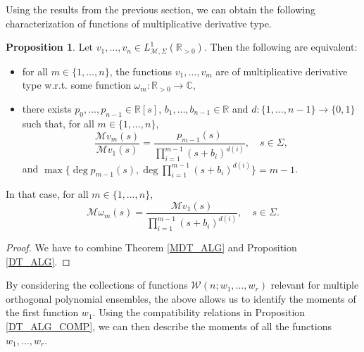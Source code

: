 \documentclass[a4paper,12pt,oneside]{article}
\theoremstyle{definition}
\newtheorem{prop}[defi]{Proposition}
\newcommand{\C}{\mathbb{C}}
\newcommand{\R}{\mathbb{R}}
\newcommand{\om}{\omega}
\newcommand{\MT}[1]{\mathcal{M}#1}
\begin{document}
Using the results from the previous section, we can obtain the following characterization of functions of multiplicative derivative type.

\begin{prop} \label{MDT_SR}
    Let $v_1,\dots,v_n\in L^1_{\MT{},\Sigma}(\R_{>0})$.
    Then the following are equivalent:
    \begin{itemize}
        \item[$i)$] for all $m\in\{1,\dots,n\}$, the functions $v_1,\dots,v_m$ are of multiplicative derivative type w.r.t. some function $\om_m:\R_{>0}\to\C$,
        \item[$ii)$] there exists $p_0,\dots,p_{n-1}\in\R[s]$, $b_1,\dots,b_{n-1}\in\R$ and $d:\{1,\dots,n-1\}\to\{0,1\}$ such that, for all $m\in\{1,\dots,n\}$,
        $$ \frac{\MT{v_m}(s)}{\MT{v_1}(s)} = \frac{p_{m-1}(s)}{\prod_{i=1}^{m-1}(s+b_i)^{d(i)}},\quad s\in\Sigma, $$
    and $\max\{\deg p_{m-1}(s),\deg \prod_{i=1}^{m-1}(s+b_i)^{d(i)}\}=m-1$.
    \end{itemize}
    In that case, for all $m\in\{1,\dots,n\}$,
    $$ \MT{\om_m}(s) = \frac{\MT{v_1}(s)}{\prod_{i=1}^{m-1} (s+b_i)^{d(i)}},\quad s\in\Sigma.$$
\end{prop}
\begin{proof}
    We have to combine Theorem \ref{MDT_ALG} and Proposition \ref{DT_ALG}.
\end{proof}    

By considering the collections of functions $\mathcal{W}(n;w_1,\dots,w_r)$ relevant for multiple orthogonal polynomial ensembles, the above allows us to identify the moments of the first function $w_1$. Using the compatibility relations in Proposition \ref{DT_ALG_COMP}, we can then describe the moments of all the functions $w_1,\dots,w_r$.
\end{document}
